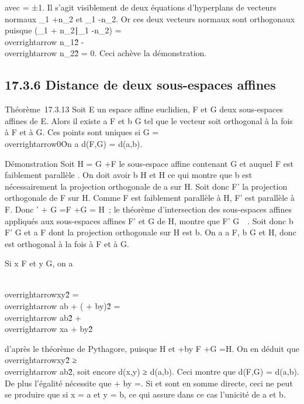 \documentclass[]{article}
\begin{document}
avec \epsilon = ±1. Il s'agit visiblement de deux équations d'hyperplans de
vecteurs normaux \overrightarrown_1
+\overrightarrow n_2 et
\overrightarrown_1
-\overrightarrow n_2. Or ces deux vecteurs
normaux sont orthogonaux puisque
(\overrightarrown_1
+\overrightarrow
n_2∣\overrightarrown_1
-\overrightarrow n_2)
=\\overrightarrow
n_1\^2
-\\overrightarrow
n_2\^2 = 0. Ceci achève la
démonstration.

\subsection{17.3.6 Distance de deux sous-espaces affines}

Théorème~17.3.13 Soit E un espace affine euclidien, F et G deux
sous-espaces affines de E. Alors il existe a \in F et b \in G tel que le
vecteur \overrightarrowab soit orthogonal à la fois à
F et à G. Ces points sont uniques si \overrightarrowF
\bigcap\overrightarrow G =
\\overrightarrow0\.
On a d(F,G) = d(a,b).

Démonstration Soit H = G +\overrightarrow F le
sous-espace affine contenant G et auquel F est faiblement parallèle . On
doit avoir b \in H et \overrightarrowab \bot H ce qui
montre que b est nécessairement la projection orthogonale de a sur H.
Soit donc F' la projection orthogonale de F sur H. Comme F est
faiblement parallèle à H, F' est parallèle à F. Donc
\overrightarrowF' +\overrightarrow
G =\overrightarrow F
+\overrightarrow G =\overrightarrow
H~; le théorème d'intersection des sous-espaces affines appliqués aux
sous-espaces affines F' et G de H, montre que F' \bigcap
G\neq~\varnothing~. Soit donc b \in F' \bigcap G et a \in F dont la
projection orthogonale sur H est b. On a a \in F, b \in G et
\overrightarrowab \bot H, donc
\overrightarrowab est orthogonal à la fois à F et à
G.

Si x \in F et y \in G, on a

\\overrightarrowxy\^2
=\\overrightarrow ab +
(\overrightarrowxa
+\overrightarrow
by)\^2
=\\overrightarrow
ab\^2
+\\overrightarrow xa
+\overrightarrow
by\^2

d'après le théorème de Pythagore, puisque
\overrightarrowab \bot\overrightarrow
H et \overrightarrowxa
+\overrightarrow by \in\overrightarrow
F +\overrightarrow G
=\overrightarrow H. On en déduit que
\\overrightarrowxy\^2
≥\\overrightarrow
ab\^2, soit encore d(x,y) ≥ d(a,b).
Ceci montre que d(F,G) = d(a,b). De plus l'égalité nécessite que
\overrightarrowxa +\overrightarrow
by =. Si
\overrightarrowF et
\overrightarrowG sont en somme directe, ceci ne peut
se produire que si x = a et y = b, ce qui assure dans ce cas l'unicité
de a et b.
\end{document}
